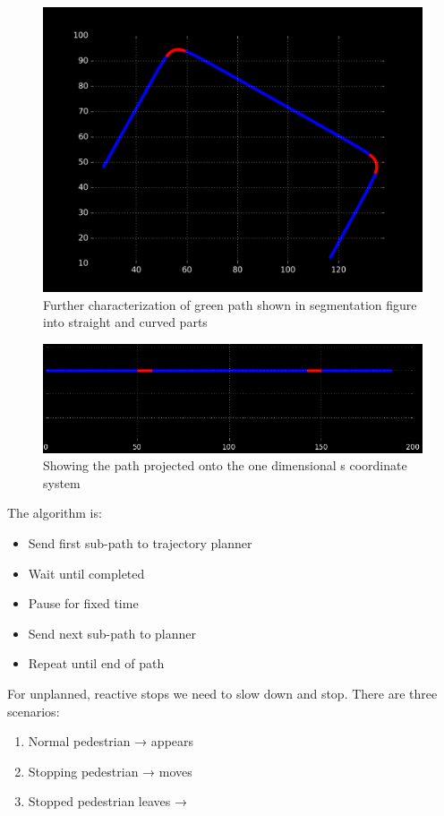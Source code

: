 \documentclass[letterpaper, 10 pt, conference]{ieeeconf}  %
\begin{document}
\begin{figure}[thpb]
  \centering
  \includegraphics[width=0.5\columnwidth]{graphics/course_highlighted_turns.png}
  \caption{Further characterization of green path shown in segmentation figure into straight and curved parts}
  \label{fig:stcur}
\end{figure}

\begin{figure}[thpb]
  \centering
  \includegraphics[width=1.0\columnwidth]{graphics/1Dsegmentation.png}
  \caption{Showing the path projected onto the one dimensional s coordinate system}
  \label{fig:scoord}
\end{figure}

The algorithm is:
\begin{itemize}
\item Send first sub-path to trajectory planner
\item Wait until completed
\item Pause for fixed time
\item Send next sub-path to planner
\item Repeat until end of path
\end{itemize}

For unplanned, reactive stops  we need to slow down and stop. There are three scenarios:
\begin{enumerate}
\item Normal pedestrian → appears
\item Stopping pedestrian → moves
\item Stopped pedestrian leaves →
\end{enumerate}
\end{document}

